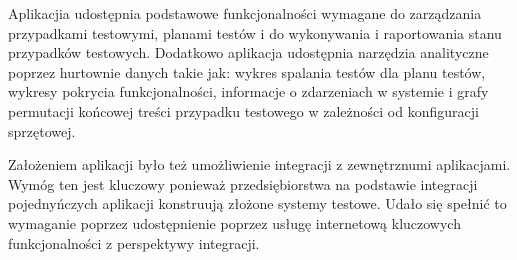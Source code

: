 Aplikacjia udostępnia podstawowe funkcjonalności wymagane do zarządzania przypadkami testowymi, planami testów  i do  wykonywania i raportowania stanu przypadków testowych. Dodatkowo aplikacja udostępnia narzędzia analityczne poprzez hurtownie danych takie jak: wykres spalania testów dla planu testów, wykresy pokrycia funkcjonalności, informacje o zdarzeniach w systemie i grafy permutacji końcowej treści przypadku testowego w zależności od konfiguracji sprzętowej.

Założeniem aplikacji było też umożliwienie integracji z zewnętrznumi aplikacjami. Wymóg ten jest kluczowy ponieważ przedsiębiorstwa na podstawie integracji pojednyńczych aplikacji konstruują złożone systemy testowe. Udało się spełnić to wymaganie poprzez udostępnienie poprzez usługę internetową kluczowych funkcjonalności z perspektywy integracji.

 
